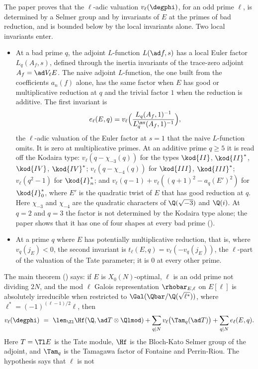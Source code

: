 The paper proves that the $\ell$-adic valuation $v_\ell(\degphi)$, for an odd prime $\ell$, is
determined by a Selmer group and by invariants of $E$ at the primes of bad reduction, and is
bounded below by the local invariants alone. Two local invariants enter.
\begin{itemize}
\item At a bad prime $q$, the adjoint $L$-function $L(\ad f,s)$ has a local Euler factor
$L_q(A_f,s)$, defined through the inertia invariants of the trace-zero adjoint $A_f=\ad V_\ell E$.
The naive adjoint $L$-function, the one built from the coefficients $a_n(f)$ alone, has the same
factor when $E$ has good or multiplicative reduction at $q$ and the trivial factor $1$ when the
reduction is additive. The first invariant is
\[
e_\ell(E,q)=v_\ell\Bigl(\frac{L_q(A_f,1)^{-1}}{L_q^{\nv}(A_f,1)^{-1}}\Bigr),
\]
the $\ell$-adic valuation of the Euler factor at $s=1$ that the naive $L$-function omits. It is
zero at multiplicative primes. At an additive prime $q\ge5$ it is read off the Kodaira type:
$v_\ell(q-\chi_{-3}(q))$ for the types $\kod{II}$, $\kod{II}^*$, $\kod{IV}$, $\kod{IV}^*$;
$v_\ell(q-\chi_{-4}(q))$ for $\kod{III}$, $\kod{III}^*$; $v_\ell(q^2-1)$ for $\kod{I}_n^*$; and
$v_\ell(q-1)+v_\ell((q+1)^2-a_q(E')^2)$ for $\kod{I}_0^*$, where $E'$ is the quadratic twist of
$E$ that has good reduction at $q$. Here $\chi_{-3}$ and $\chi_{-4}$ are the quadratic characters
of $\Q(\sqrt{-3})$ and $\Q(i)$. At $q=2$ and $q=3$ the factor is not determined by the Kodaira type
alone; the paper shows that it has one of four shapes at every bad prime
().
\item At a prime $q$ where $E$ has potentially multiplicative reduction, that is, where
$v_q(j_E)<0$, the second invariant is $t_\ell(E,q)=v_\ell(-v_q(j_E))$, the $\ell$-part of the
valuation of the Tate parameter; it is $0$ at every other prime.
\end{itemize}
The main theorem () says: if $E$ is $X_0(N)$-optimal, $\ell$ is an odd
prime not dividing $2N$, and the mod $\ell$ Galois representation $\rhobar_{E,\ell}$ on $E[\ell]$
is absolutely irreducible when restricted to $\Gal(\Qbar/\Q(\sqrt{\ell^*}))$, where
$\ell^*=(-1)^{(\ell-1)/2}\ell$, then
\[
v_\ell(\degphi)\ =\ \len_{\Zl}\Hf(\Q,\ad T\otimes\Qlmod)
+\sum_{q\mid N}v_\ell\bigl(\Tam_q(\ad T)\bigr)+\sum_{q\mid N}e_\ell(E,q).
\]
Here $T=\Tl E$ is the Tate module, $\Hf$ is the Bloch-Kato Selmer group of the adjoint, and
$\Tam_q$ is the Tamagawa factor of Fontaine and Perrin-Riou. The hypothesis says that $\ell$ is not
